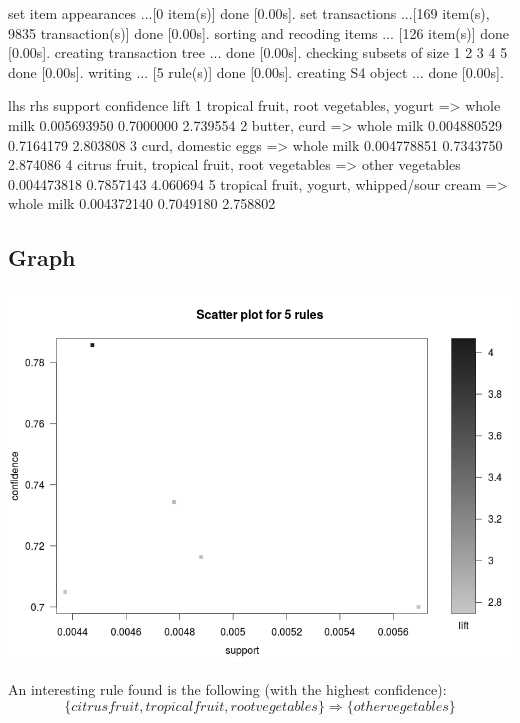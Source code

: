 \documentclass{scrartcl}
\begin{document}
\begin{Schunk}
\begin{Soutput}
set item appearances ...[0 item(s)] done [0.00s].
set transactions ...[169 item(s), 9835 transaction(s)] done [0.00s].
sorting and recoding items ... [126 item(s)] done [0.00s].
creating transaction tree ... done [0.00s].
checking subsets of size 1 2 3 4 5 done [0.00s].
writing ... [5 rule(s)] done [0.00s].
creating S4 object  ... done [0.00s].
\end{Soutput}
\begin{Soutput}
  lhs                     rhs                    support confidence     lift
1 {tropical fruit,                                                          
   root vegetables,                                                         
   yogurt}             => {whole milk}       0.005693950  0.7000000 2.739554
2 {butter,                                                                  
   curd}               => {whole milk}       0.004880529  0.7164179 2.803808
3 {curd,                                                                    
   domestic eggs}      => {whole milk}       0.004778851  0.7343750 2.874086
4 {citrus fruit,                                                            
   tropical fruit,                                                          
   root vegetables}    => {other vegetables} 0.004473818  0.7857143 4.060694
5 {tropical fruit,                                                          
   yogurt,                                                                  
   whipped/sour cream} => {whole milk}       0.004372140  0.7049180 2.758802
\end{Soutput}
\end{Schunk}

\subsection*{Graph}
\includegraphics[width=\textwidth]{plot.png}

\bigskip

An interesting rule found is the following (with the highest confidence):
$$\{citrus fruit, tropical fruit, root vegetables\} \Rightarrow \{other vegetables\}$$
\end{document}
